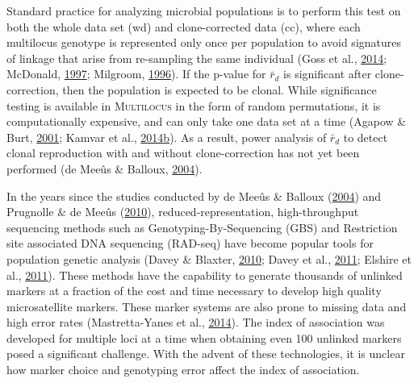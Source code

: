 \documentclass[double,11pt]{beavtex}
\begin{document}
  Standard practice for analyzing microbial populations is to perform this
  test on both the whole data set (wd) and clone-corrected data (cc),
  where each multilocus genotype is represented only once per population
  to avoid signatures of linkage that arise from re-sampling the same
  individual (Goss et al., \protect\hyperlink{ref-goss2014irish}{2014};
  McDonald, \protect\hyperlink{ref-mcdonald1997population}{1997};
  Milgroom, \protect\hyperlink{ref-milgroom1996recombination}{1996}). If
  the p-value for \(\bar{r}_d\) is significant after clone-correction,
  then the population is expected to be clonal. While significance testing
  is available in \textsc{Multilocus} in the form of random permutations,
  it is computationally expensive, and can only take one data set at a
  time (Agapow \& Burt, \protect\hyperlink{ref-Agapow_2001}{2001}; Kamvar
  et al.,
  \protect\hyperlink{ref-kamvar2014poppr}{2014}\protect\hyperlink{ref-kamvar2014poppr}{b}).
  As a result, power analysis of \(\bar{r}_d\) to detect clonal
  reproduction with and without clone-correction has not yet been
  performed (de Meeûs \& Balloux,
  \protect\hyperlink{ref-de2004clonal}{2004}).
  
  In the years since the studies conducted by de Meeûs \& Balloux
  (\protect\hyperlink{ref-de2004clonal}{2004}) and Prugnolle \& de Meeûs
  (\protect\hyperlink{ref-prugnolle2010apparent}{2010}),
  reduced-representation, high-throughput sequencing methods such as
  Genotyping-By-Sequencing (GBS) and Restriction site associated DNA
  sequencing (RAD-seq) have become popular tools for population genetic
  analysis (Davey \& Blaxter, \protect\hyperlink{ref-davey2010rad}{2010};
  Davey et al., \protect\hyperlink{ref-davey2011genome}{2011}; Elshire et
  al., \protect\hyperlink{ref-elshire2011robust}{2011}). These methods
  have the capability to generate thousands of unlinked markers at a
  fraction of the cost and time necessary to develop high quality
  microsatellite markers. These marker systems are also prone to missing
  data and high error rates (Mastretta-Yanes et al.,
  \protect\hyperlink{ref-mastretta2015restriction}{2014}). The index of
  association was developed for multiple loci at a time when obtaining
  even 100 unlinked markers posed a significant challenge. With the advent
  of these technologies, it is unclear how marker choice and genotyping
  error affect the index of association.
  
\end{document}
